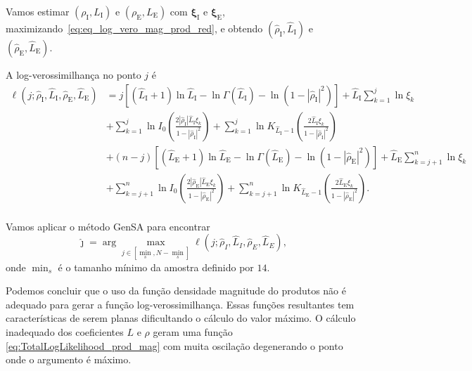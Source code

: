 Vamos estimar $(\rho_\text{I},L_\text{I})$ e $(\rho_\text{E},L_\text{E})$ com $\bm \xi_\text{I}$ e $\bm \xi_\text{E}$, maximizando~\eqref{eq:eq_log_vero_mag_prod_red}, e obtendo $(\widehat{\rho}_\text{I}, \widehat{L}_\text{I})$ e $(\widehat{\rho}_\text{E}, \widehat{L}_\text{E})$.

A log-verossimilhança no ponto $j$ é
\begin{equation}\label{eq:TotalLogLikelihood_prod_mag}
\begin{split}
\ell(j;\widehat{\rho}_\text{I}, \widehat{L}_\text{I}, \widehat{\rho}_\text{E}, \widehat{L}_\text{E})&
=j\left[(\widehat{L}_\text{I}+1)\ln \widehat{L}_\text{I}-\ln\Gamma(\widehat{L}_\text{I})-\ln(1-|\widehat{\rho}_\text{I}|^2)\right]
+\widehat{L}_\text{I}\sum_{k=1}^{j} \ln\xi_k\\
&+\sum_{k=1}^{j}\ln I_0\left(\frac{2|\widehat{\rho}_\text{I}|\widehat{L}_\text{I}\xi_k}{1-|\widehat{\rho}_\text{I}|^2}\right)
+ \sum_{k=1}^{j}\ln K_{\widehat{L}_\text{I}-1}\left(\frac{2\widehat{L}_\text{I}\xi_k}{1-|\widehat{\rho}_\text{I}|^2}\right)\\
&+(n-j)\left[(\widehat{L}_\text{E}+1)\ln \widehat{L}_\text{E}-\ln\Gamma(\widehat{L}_\text{E})-\ln(1-|\widehat{\rho}_\text{E}|^2)\right]
+\widehat{L}_\text{E}\sum_{k=j+1}^{n} \ln\xi_k\\
&+\sum_{k=j+1}^{n}\ln I_0\left(\frac{2|\widehat{\rho}_\text{E}|\widehat{L}_\text{E}\xi_k}{1-|\widehat{\rho}_\text{E}|^2}\right)
+ \sum_{k=j+1}^{n}\ln K_{\widehat{L}_\text{E}-1}\left(\frac{2\widehat{L}_\text{E}\xi_k}{1-|\widehat{\rho}_\text{E}|^2}\right).\\
\end{split}
\end{equation}

Vamos aplicar o método GenSA para encontrar
$$
\widehat{\jmath}= \arg\max\limits_{j\in [\min_s,N-\min_s]}\ell(j;\widehat{\rho}_I, \widehat{L}_I,\widehat{\rho}_E, \widehat{L}_E),
$$ 
onde $\min_s$ é o tamanho mínimo da amostra definido por $14$.

Podemos concluir que o uso da função densidade magnitude do produtos não é adequado para gerar a função log-verossimilhança. Essas funções resultantes tem características de serem planas dificultando o cálculo do valor máximo. O cálculo inadequado dos coeficientes $L$  e $\rho$ geram uma função \eqref{eq:TotalLogLikelihood_prod_mag} com muita oscilação degenerando o ponto onde o argumento é máximo.


